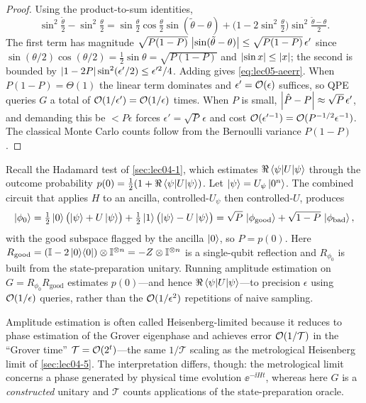 \begin{proof}
Using the product-to-sum identities,
\[
  \sin^2\tfrac{\tilde\theta}{2}-\sin^2\tfrac{\theta}{2}
   =\sin\tfrac{\theta}{2}\cos\tfrac{\theta}{2}\sin(\tilde\theta-\theta)
    +\bigl(1-2\sin^2\tfrac{\theta}{2}\bigr)\sin^2\tfrac{\tilde\theta-\theta}{2}.
\]
The first term has magnitude
$\sqrt{P(1-P)}\,\left\lvert \sin(\tilde\theta-\theta) \right\rvert\le\sqrt{P(1-P)}\,\epsilon'$ since
$\sin(\theta/2)\cos(\theta/2)=\tfrac12\sin\theta=\sqrt{P(1-P)}$ and
$\left\lvert \sin x \right\rvert\le\left\lvert x \right\rvert$; the second is bounded by
$\left\lvert 1-2P \right\rvert\sin^2(\epsilon'/2)\le\epsilon'^2/4$. Adding gives
\eqref{eq:lec05-aeerr}. When $P(1-P)=\Theta(1)$ the linear term dominates and
$\epsilon'=\mathcal{O}(\epsilon)$ suffices, so QPE queries $G$ a total of
$\mathcal{O}(1/\epsilon')=\mathcal{O}(1/\epsilon)$ times. When $P$ is small,
$\left\lvert \hat P-P \right\rvert\approx\sqrt P\,\epsilon'$, and demanding this be $<P\epsilon$
forces $\epsilon'=\sqrt P\,\epsilon$ and cost
$\mathcal{O}(\epsilon'^{-1})=\mathcal{O}(P^{-1/2}\epsilon^{-1})$. The classical Monte Carlo
counts follow from the Bernoulli variance $P(1-P)$.
\end{proof}

\begin{example}
\label{exa:lec05-hadamard}
Recall the Hadamard test of \cref{sec:lec04-1}, which estimates
$\Re\braket{\psi|U|\psi}$ through the outcome probability
$p(0)=\tfrac12(1+\Re\braket{\psi|U|\psi})$. Let $\ket{\psi}=U_\psi\ket{0^n}$. The
combined circuit that applies $H$ to an ancilla, controlled-$U_\psi$ then
controlled-$U$, produces
\[
  \ket{\phi_0}=\tfrac12\ket{0}\bigl(\ket{\psi}+U\ket{\psi}\bigr)
              +\tfrac12\ket{1}\bigl(\ket{\psi}-U\ket{\psi}\bigr)
             =\sqrt{P}\,\ket{\phi_{\mathrm{good}}}
              +\sqrt{1-P}\,\ket{\phi_{\mathrm{bad}}},
\]
with the good subspace flagged by the ancilla $\ket{0}$, so
$P=p(0)$. Here $R_{\mathrm{good}}=(\mathbb{I}-2\ket{0}\!\bra{0})\otimes\mathbb{I}^{\otimes n}
=-Z\otimes\mathbb{I}^{\otimes n}$ is a single-qubit reflection and $R_{\phi_0}$ is built
from the state-preparation unitary. Running amplitude estimation on
$G=R_{\phi_0}R_{\mathrm{good}}$ estimates $p(0)$---and hence
$\Re\braket{\psi|U|\psi}$---to precision $\epsilon$ using $\mathcal{O}(1/\epsilon)$
queries, rather than the $\mathcal{O}(1/\epsilon^2)$ repetitions of naive sampling.
\end{example}

\begin{remark}
\label{rem:lec05-heisenberg}
Amplitude estimation is often called Heisenberg-limited because it reduces to
phase estimation of the Grover eigenphase and achieves error $\mathcal{O}(1/\mathcal T)$
in the ``Grover time'' $\mathcal T=\mathcal{O}(2^{t})$---the same $1/\mathcal T$ scaling
as the metrological Heisenberg limit of \cref{sec:lec04-5}. The interpretation
differs, though: the metrological limit concerns a phase generated by physical
time evolution $\ee^{-\ii Ht}$, whereas here $G$ is a \emph{constructed} unitary
and $\mathcal T$ counts applications of the state-preparation oracle.
\end{remark}

